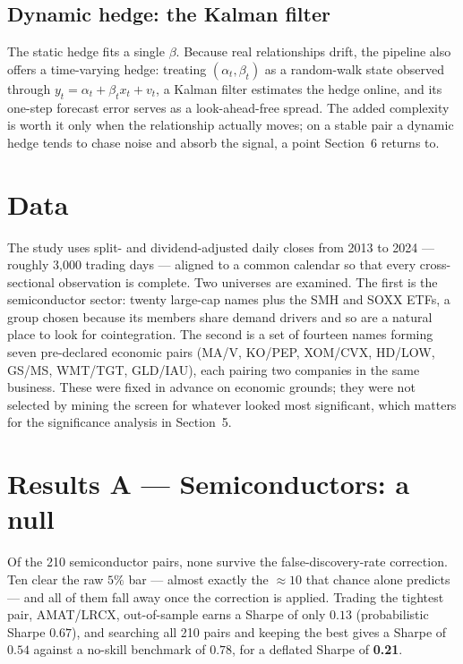 \documentclass[11pt]{article}
\begin{document}
\subsection{Dynamic hedge: the Kalman filter}
The static hedge fits a single $\beta$. Because real relationships drift, the pipeline also offers a
time-varying hedge: treating $(\alpha_t, \beta_t)$ as a random-walk state observed through
$y_t = \alpha_t + \beta_t x_t + v_t$, a Kalman filter estimates the hedge online, and its one-step forecast
error serves as a look-ahead-free spread. The added complexity is worth it only when the relationship
actually moves; on a stable pair a dynamic hedge tends to chase noise and absorb the signal, a point
Section~6 returns to.

\section{Data}
The study uses split- and dividend-adjusted daily closes from 2013 to 2024 --- roughly 3{,}000 trading
days --- aligned to a common calendar so that every cross-sectional observation is complete. Two universes
are examined. The first is the semiconductor sector: twenty large-cap names plus the SMH and SOXX ETFs, a
group chosen because its members share demand drivers and so are a natural place to look for
cointegration. The second is a set of fourteen names forming seven pre-declared economic pairs (MA/V,
KO/PEP, XOM/CVX, HD/LOW, GS/MS, WMT/TGT, GLD/IAU), each pairing two companies in the same business. These
were fixed in advance on economic grounds; they were not selected by mining the screen for whatever looked
most significant, which matters for the significance analysis in Section~5.

\section{Results A --- Semiconductors: a null}
Of the 210 semiconductor pairs, none survive the false-discovery-rate correction. Ten clear the raw $5\%$
bar --- almost exactly the $\approx 10$ that chance alone predicts --- and all of them fall away once the
correction is applied. Trading the tightest pair, AMAT/LRCX, out-of-sample earns a Sharpe of only $0.13$
(probabilistic Sharpe $0.67$), and searching all 210 pairs and keeping the best gives a Sharpe of $0.54$
against a no-skill benchmark of $0.78$, for a deflated Sharpe of \textbf{0.21}.
\end{document}
